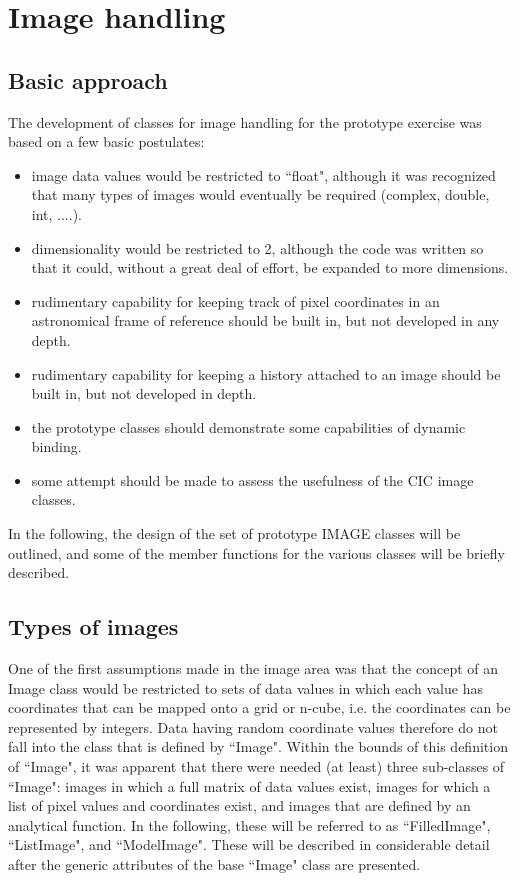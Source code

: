 \chapter{Image handling}

\section{Basic approach}

        The development of classes for image handling for the prototype \aipspp
exercise was based on a few basic postulates:

\begin{itemize}
\item
image data values would be restricted to ``float", although it was
recognized that many types of images would eventually be required (complex,
double, int, ....).
\item
dimensionality would be restricted to 2, although the code was
written so that it could, without a great deal of effort, be expanded to more
dimensions.
\item
rudimentary capability for keeping track of pixel coordinates in
an astronomical frame of reference should be built in, but not developed in
any depth.
\item
rudimentary capability for keeping a history attached to an image
should be built in, but not developed in depth.
\item
the prototype classes should demonstrate some capabilities of
dynamic binding.
\item
some attempt should be made to assess the usefulness of the
CIC image classes.
\end{itemize}

        In the following, the design of the set of prototype IMAGE classes 
will be outlined, and some of the member functions for the various classes
will be briefly described.


\section{Types of images}

        One of the first assumptions made in the image area was that the
concept of an Image class would be restricted to sets of data values in
which each value has coordinates that can be mapped onto a grid or n-cube,
i.e. the coordinates can be represented by integers. Data having random
coordinate values therefore do not fall into the class that is defined by
``Image". Within the bounds of this definition of ``Image", it was apparent that 
there were needed (at least) three sub-classes of ``Image": images in which 
a full matrix of data values exist, images for which a list of pixel values and
coordinates exist, and images that are defined by an analytical function.
In the following, these will be referred to as ``FilledImage", ``ListImage",
and ``ModelImage". These will be described in considerable detail after the
generic attributes of the base ``Image" class are presented.



